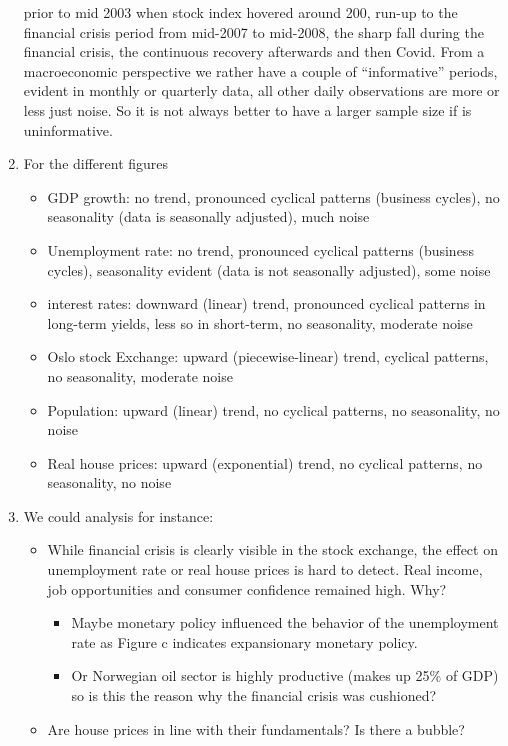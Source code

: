 \begin{enumerate}
  prior to mid 2003 when stock index hovered around 200,
  run-up to the financial crisis period from mid-2007 to mid-2008,
  the sharp fall during the financial crisis,
  the continuous recovery afterwards
  and then Covid.
From a macroeconomic perspective we rather have a couple of \enquote{informative} periods, evident in monthly or quarterly data,
  all other daily observations are more or less just noise.
So it is not always better to have a larger sample size if is uninformative.
\item For the different figures
\begin{itemize}
    \item GDP growth: no trend, pronounced cyclical patterns (business cycles), no seasonality (data is seasonally adjusted), much noise
    \item Unemployment rate: no trend, pronounced cyclical patterns (business cycles), seasonality evident (data is not seasonally adjusted), some noise
    \item interest rates: downward (linear) trend, pronounced cyclical patterns in long-term yields, less so in short-term, no seasonality, moderate noise
    \item Oslo stock Exchange: upward (piecewise-linear) trend, cyclical patterns, no seasonality, moderate noise
    \item Population: upward (linear) trend, no cyclical patterns, no seasonality, no noise
    \item Real house prices: upward (exponential) trend, no cyclical patterns, no seasonality, no noise
\end{itemize}
\item We could analysis for instance:
    \begin{itemize}
        \item While financial crisis is clearly visible in the stock exchange,
          the effect on unemployment rate or real house prices is hard to detect.
        Real income, job opportunities and consumer confidence remained high. Why?
        \begin{itemize} 
            \item Maybe monetary policy influenced the behavior of the unemployment rate as Figure c indicates expansionary monetary policy.
            \item Or Norwegian oil sector is highly productive (makes up 25\% of GDP) so is this the reason why the financial crisis was cushioned?
        \end{itemize}
        \item Are house prices in line with their fundamentals? Is there a bubble?

\end{itemize}
\end{enumerate}
